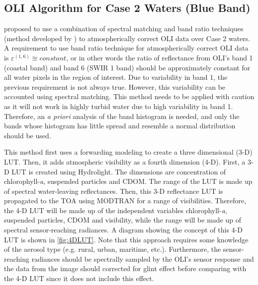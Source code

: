 \subsection{OLI Algorithm for Case 2 Waters (Blue Band)}
\cite{GeraceThesis} proposed to use a combination of spectral matching and band ratio techniques (method developed by \cite{Gordon:1997}) to atmospherically correct OLI data over Case 2 waters. A requirement to use band ratio technique for atmospherically correct OLI data is $\varepsilon^{(1,6)}\cong constant$, or in other words the ratio of reflectance from OLI's band 1 (coastal band) and band 6 (SWIR 1 band) should be approximately constant for all water pixels in the region of interest. Due to variability in band 1, the previous requirement is not always true. However, this variability can be accounted using spectral matching. This method needs to be applied with caution as it will not work in highly turbid water due to high variability in band 1. Therefore, an {\it a priori} analysis of the band histogram is needed, and only the bands whose histogram has little spread and resemble a normal distribution should be used.

This method first uses a forwarding modeling to create a three dimensional (3-D) LUT. Then, it adds atmospheric visibility as a fourth dimension (4-D). First, a 3-D LUT is created using Hydrolight. The dimensions are concentration of chlorophyll-{\it a}, suspended particles and CDOM. The range of the LUT is made up of spectral water-leaving reflectances. Then, this 3-D reflectance LUT is propagated to the TOA using MODTRAN for a range of visibilities. Therefore, the 4-D LUT will be made up of the independent variables chlorophyll-{\it a}, suspended particles, CDOM and visibility, while the range will be made up of spectral sensor-reaching radiances. A diagram showing the concept of this 4-D LUT is shown in \autoref{fig:4DLUT}. Note that this approach requires some knowledge of the aerosol type (e.g. rural, urban, maritime, etc.). Furthermore, the sensor-reaching radiances should be spectrally sampled by the OLI's sensor response and the data from the image should corrected for glint effect before comparing with the 4-D LUT since it does not include this effect.

